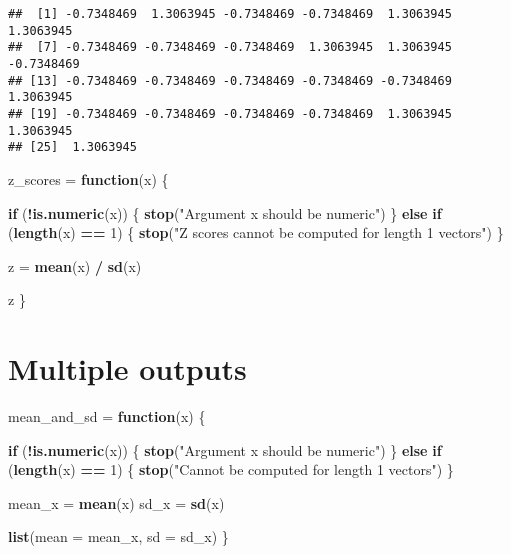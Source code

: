 \documentclass[
]{article}
\newenvironment{Shaded}{\begin{snugshade}}{\end{snugshade}}
\newcommand{\AttributeTok}[1]{\textcolor[rgb]{0.13,0.29,0.53}{#1}}
\newcommand{\ControlFlowTok}[1]{\textcolor[rgb]{0.13,0.29,0.53}{\textbf{#1}}}
\newcommand{\DecValTok}[1]{\textcolor[rgb]{0.00,0.00,0.81}{#1}}
\newcommand{\FunctionTok}[1]{\textcolor[rgb]{0.13,0.29,0.53}{\textbf{#1}}}
\newcommand{\NormalTok}[1]{#1}
\newcommand{\OtherTok}[1]{\textcolor[rgb]{0.56,0.35,0.01}{#1}}
\newcommand{\SpecialCharTok}[1]{\textcolor[rgb]{0.81,0.36,0.00}{\textbf{#1}}}
\newcommand{\StringTok}[1]{\textcolor[rgb]{0.31,0.60,0.02}{#1}}
\begin{document}
\begin{verbatim}
##  [1] -0.7348469  1.3063945 -0.7348469 -0.7348469  1.3063945  1.3063945
##  [7] -0.7348469 -0.7348469 -0.7348469  1.3063945  1.3063945 -0.7348469
## [13] -0.7348469 -0.7348469 -0.7348469 -0.7348469 -0.7348469  1.3063945
## [19] -0.7348469 -0.7348469 -0.7348469 -0.7348469  1.3063945  1.3063945
## [25]  1.3063945
\end{verbatim}

\begin{Shaded}
\begin{Highlighting}[]
\NormalTok{z\_scores }\OtherTok{=} \ControlFlowTok{function}\NormalTok{(x) \{}
  
  \ControlFlowTok{if}\NormalTok{ (}\SpecialCharTok{!}\FunctionTok{is.numeric}\NormalTok{(x)) \{}
    \FunctionTok{stop}\NormalTok{(}\StringTok{"Argument x should be numeric"}\NormalTok{)}
\NormalTok{  \} }\ControlFlowTok{else} \ControlFlowTok{if}\NormalTok{ (}\FunctionTok{length}\NormalTok{(x) }\SpecialCharTok{==} \DecValTok{1}\NormalTok{) \{}
    \FunctionTok{stop}\NormalTok{(}\StringTok{"Z scores cannot be computed for length 1 vectors"}\NormalTok{)}
\NormalTok{  \}}
  
\NormalTok{  z }\OtherTok{=} \FunctionTok{mean}\NormalTok{(x) }\SpecialCharTok{/} \FunctionTok{sd}\NormalTok{(x)}
  
\NormalTok{  z}
\NormalTok{\}}
\end{Highlighting}
\end{Shaded}

\section{Multiple outputs}\label{multiple-outputs}

\begin{Shaded}
\begin{Highlighting}[]
\NormalTok{mean\_and\_sd }\OtherTok{=} \ControlFlowTok{function}\NormalTok{(x) \{}
  
  \ControlFlowTok{if}\NormalTok{ (}\SpecialCharTok{!}\FunctionTok{is.numeric}\NormalTok{(x)) \{}
    \FunctionTok{stop}\NormalTok{(}\StringTok{"Argument x should be numeric"}\NormalTok{)}
\NormalTok{  \} }\ControlFlowTok{else} \ControlFlowTok{if}\NormalTok{ (}\FunctionTok{length}\NormalTok{(x) }\SpecialCharTok{==} \DecValTok{1}\NormalTok{) \{}
    \FunctionTok{stop}\NormalTok{(}\StringTok{"Cannot be computed for length 1 vectors"}\NormalTok{)}
\NormalTok{  \}}
  
\NormalTok{  mean\_x }\OtherTok{=} \FunctionTok{mean}\NormalTok{(x)}
\NormalTok{  sd\_x }\OtherTok{=} \FunctionTok{sd}\NormalTok{(x)}

  \FunctionTok{list}\NormalTok{(}\AttributeTok{mean =}\NormalTok{ mean\_x, }
       \AttributeTok{sd =}\NormalTok{ sd\_x)}
\NormalTok{\}}
\end{Highlighting}
\end{Shaded}
\end{document}

